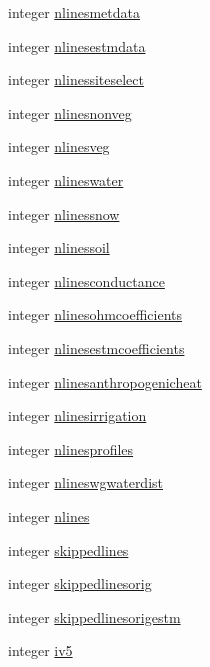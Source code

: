 \begin{DoxyCompactItemize}
integer \hyperlink{namespaceinitial_add0284c6ac01e5faf6465d5f7888b82e}{nlinesmetdata}
\item 
integer \hyperlink{namespaceinitial_a60bf0e6edcda66939777e00a471d6441}{nlinesestmdata}
\item 
integer \hyperlink{namespaceinitial_a3e3aa2dac6195f74548fffbcb36e70a9}{nlinessiteselect}
\item 
integer \hyperlink{namespaceinitial_afaaf24e20f8673a6c00a7b282fdccb59}{nlinesnonveg}
\item 
integer \hyperlink{namespaceinitial_a40dff61f79d7b5523ba09cd9d74903aa}{nlinesveg}
\item 
integer \hyperlink{namespaceinitial_aaea90ff1bd06bb3df87ea523480ef5e3}{nlineswater}
\item 
integer \hyperlink{namespaceinitial_ae61ba75b9e7367f983d542386c9f0674}{nlinessnow}
\item 
integer \hyperlink{namespaceinitial_acdc8f5cc81a9f02b6b481ef8d4619400}{nlinessoil}
\item 
integer \hyperlink{namespaceinitial_ab8823ecdd51c6ba0d2a52a111a1c95f4}{nlinesconductance}
\item 
integer \hyperlink{namespaceinitial_a24ff42afc93b609bca01fc9f83884f41}{nlinesohmcoefficients}
\item 
integer \hyperlink{namespaceinitial_ab25a9647691a26042f69a1cd4c71dbc5}{nlinesestmcoefficients}
\item 
integer \hyperlink{namespaceinitial_a0f40beedf8434899dcbdd965487411c4}{nlinesanthropogenicheat}
\item 
integer \hyperlink{namespaceinitial_a06034898c756c3397298055a77d34c08}{nlinesirrigation}
\item 
integer \hyperlink{namespaceinitial_a50fc08b99235baf0ef2959b630731ab7}{nlinesprofiles}
\item 
integer \hyperlink{namespaceinitial_aa6972faf65c690ae7dcd1d0273db5e5c}{nlineswgwaterdist}
\item 
integer \hyperlink{namespaceinitial_a866c6f9bce6417b259081b34ebbd9f4c}{nlines}
\item 
integer \hyperlink{namespaceinitial_ac8bbf58d250949afdd410ea446af2672}{skippedlines}
\item 
integer \hyperlink{namespaceinitial_a10df3f69c115c80116ea720242fc42f0}{skippedlinesorig}
\item 
integer \hyperlink{namespaceinitial_add6dafb7b5eb7b3be03f1ef5ea9ee0c7}{skippedlinesorigestm}
\item 
integer \hyperlink{namespaceinitial_ac0085ee292167191015e55edc224e2d7}{iv5}
\end{DoxyCompactItemize}



